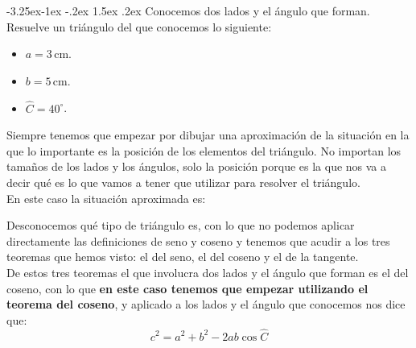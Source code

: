 \documentclass[a4paper,11pt,answers]{exam}
\makeatletter
\newcommand{\degree}{^\circ}
\renewcommand\paragraph{\@startsection{paragraph}{4}{\z@}%
                                     {-3.25ex\@plus -1ex \@minus -.2ex}%
                                     {1.5ex \@plus .2ex}%
                                     {\normalfont\normalsize\bfseries}}
\makeatother
\begin{document}
\paragraph{Conocemos dos lados y el ángulo que forman.}
Resuelve un triángulo del que conocemos lo siguiente:
\begin{itemize}
\item $a=3$\,cm.
\item $b=5$\,cm.
\item $\widehat{C} = 40\degree$.
\end{itemize}
\begin{solution}
  Siempre tenemos que empezar por dibujar una aproximación de la situación en la que lo importante
  es la posición de los elementos del triángulo. No importan los tamaños de los lados y los ángulos,
  solo la posición porque es la que nos va a decir qué es lo que vamos a tener que utilizar para
  resolver el triángulo.\\
  En este caso la situación aproximada es:
  \begin{center}
  \end{center}
  Desconocemos qué tipo de triángulo es, con lo que no podemos aplicar directamente las definiciones de seno y coseno y tenemos que acudir a los tres teoremas que hemos visto: el del seno, el del
  coseno y el de la tangente.\\
  De estos tres teoremas el que involucra dos lados y el ángulo que forman es el del coseno, con lo
  que \textbf{en este caso tenemos que empezar utilizando el teorema del coseno}, y aplicado 
  a los lados y el ángulo que conocemos nos dice que:
  \[c^2 = a^2 + b^2 - 2ab\cos \widehat{C}\]

\end{solution}
\end{document}
